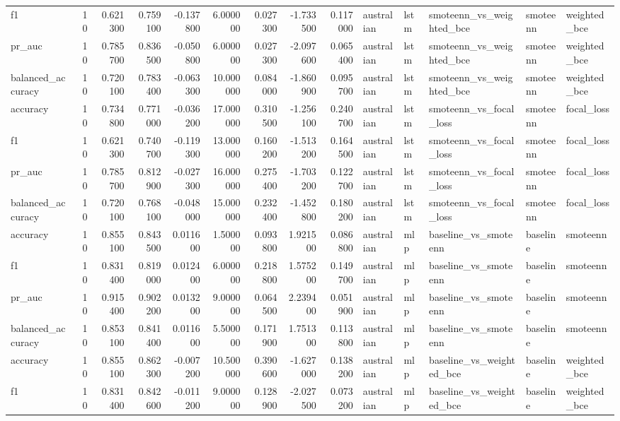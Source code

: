 \begin{tabular}{lrrrrrrrrlllll}
f1 & 10 & 0.621300 & 0.759100 & -0.137800 & 6.000000 & 0.027300 & -1.733500 & 0.117000 & australian & lstm & smoteenn_vs_weighted_bce & smoteenn & weighted_bce \\
pr_auc & 10 & 0.785700 & 0.836500 & -0.050800 & 6.000000 & 0.027300 & -2.097600 & 0.065400 & australian & lstm & smoteenn_vs_weighted_bce & smoteenn & weighted_bce \\
balanced_accuracy & 10 & 0.720100 & 0.783400 & -0.063300 & 10.000000 & 0.084000 & -1.860900 & 0.095700 & australian & lstm & smoteenn_vs_weighted_bce & smoteenn & weighted_bce \\
accuracy & 10 & 0.734800 & 0.771000 & -0.036200 & 17.000000 & 0.310500 & -1.256100 & 0.240700 & australian & lstm & smoteenn_vs_focal_loss & smoteenn & focal_loss \\
f1 & 10 & 0.621300 & 0.740700 & -0.119300 & 13.000000 & 0.160200 & -1.513200 & 0.164500 & australian & lstm & smoteenn_vs_focal_loss & smoteenn & focal_loss \\
pr_auc & 10 & 0.785700 & 0.812900 & -0.027300 & 16.000000 & 0.275400 & -1.703200 & 0.122700 & australian & lstm & smoteenn_vs_focal_loss & smoteenn & focal_loss \\
balanced_accuracy & 10 & 0.720100 & 0.768100 & -0.048000 & 15.000000 & 0.232400 & -1.452800 & 0.180200 & australian & lstm & smoteenn_vs_focal_loss & smoteenn & focal_loss \\
accuracy & 10 & 0.855100 & 0.843500 & 0.011600 & 1.500000 & 0.093800 & 1.921500 & 0.086800 & australian & mlp & baseline_vs_smoteenn & baseline & smoteenn \\
f1 & 10 & 0.831400 & 0.819000 & 0.012400 & 6.000000 & 0.218800 & 1.575200 & 0.149700 & australian & mlp & baseline_vs_smoteenn & baseline & smoteenn \\
pr_auc & 10 & 0.915400 & 0.902200 & 0.013200 & 9.000000 & 0.064500 & 2.239400 & 0.051900 & australian & mlp & baseline_vs_smoteenn & baseline & smoteenn \\
balanced_accuracy & 10 & 0.853100 & 0.841400 & 0.011600 & 5.500000 & 0.171900 & 1.751300 & 0.113800 & australian & mlp & baseline_vs_smoteenn & baseline & smoteenn \\
accuracy & 10 & 0.855100 & 0.862300 & -0.007200 & 10.500000 & 0.390600 & -1.627000 & 0.138200 & australian & mlp & baseline_vs_weighted_bce & baseline & weighted_bce \\
f1 & 10 & 0.831400 & 0.842600 & -0.011200 & 9.000000 & 0.128900 & -2.027500 & 0.073200 & australian & mlp & baseline_vs_weighted_bce & baseline & weighted_bce \\

\end{tabular}
